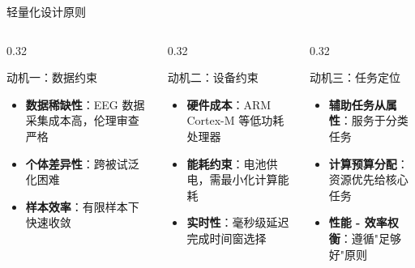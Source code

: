 \begin{frame}{轻量化设计原则}
    \begin{columns}[T]
        \begin{column}{0.32\textwidth}
            \begin{block}{\centering \normalsize 动机一：数据约束}
                \footnotesize
                \begin{itemize}
                    \item \textbf{数据稀缺性}：EEG 数据采集成本高，伦理审查严格
                    \item \textbf{个体差异性}：跨被试泛化困难
                    \item \textbf{样本效率}：有限样本下快速收敛
                \end{itemize}
            \end{block}
        \end{column}

        \begin{column}{0.32\textwidth}
            \begin{block}{\centering \normalsize 动机二：设备约束}
                \footnotesize
                \begin{itemize}
                    \item \textbf{硬件成本}：ARM Cortex-M 等低功耗处理器
                    \item \textbf{能耗约束}：电池供电，需最小化计算能耗
                    \item \textbf{实时性}：毫秒级延迟完成时间窗选择
                \end{itemize}
            \end{block}
        \end{column}

        \begin{column}{0.32\textwidth}
            \begin{block}{\centering \normalsize 动机三：任务定位}
                \footnotesize
                \begin{itemize}
                    \item \textbf{辅助任务从属性}：服务于分类任务
                    \item \textbf{计算预算分配}：资源优先给核心任务
                    \item \textbf{性能 - 效率权衡}：遵循"足够好"原则
                \end{itemize}
            \end{block}
        \end{column}
    \end{columns}


\end{frame}

